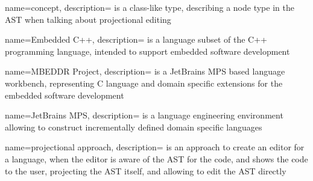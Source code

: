 

{
  name=concept,
  description={ is a class-like type, describing a node type in the AST when talking about projectional editing}
}




{
  name=Embedded C++,
  description={ is a language subset of the C++ programming language, intended to
  support embedded software development}
}



{
  name=MBEDDR Project,
  description={ is a JetBrains MPS based language workbench, representing C language and domain specific
  extensions for the embedded software development}
}


{
  name=JetBrains MPS,
  description={ is a language engineering environment 
  allowing to construct incrementally defined domain specific languages}
}

{
  name=projectional approach,
  description={ is an approach to create an editor for a language, when the editor is 
  aware of the AST for the code, and shows the code to the user, projecting the 
  AST itself, and allowing to edit the AST directly}
}
